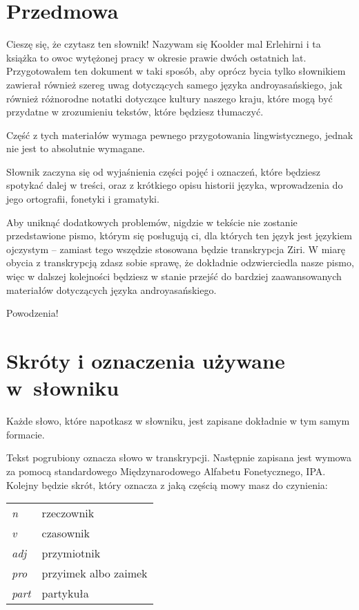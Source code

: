 \newpage

\section{Przedmowa}

Cieszę się, że czytasz ten słownik! Nazywam się Koolder mal Erlehirni i ta książka to owoc wytężonej pracy w okresie prawie dwóch ostatnich lat. Przygotowałem ten dokument w taki sposób, aby oprócz bycia tylko słownikiem zawierał również szereg uwag dotyczących samego języka androyasańskiego, jak również różnorodne notatki dotyczące kultury naszego kraju, które mogą być przydatne w zrozumieniu tekstów, które będziesz tłumaczyć.

Część z tych materiałów wymaga pewnego przygotowania lingwistycznego, jednak nie jest to absolutnie wymagane.

Słownik zaczyna się od wyjaśnienia części pojęć i oznaczeń, które będziesz spotykać dalej w treści, oraz z krótkiego opisu historii języka, wprowadzenia do jego ortografii, fonetyki i gramatyki.

Aby uniknąć dodatkowych problemów, nigdzie w tekście nie zostanie przedstawione pismo, którym się posługują ci, dla których ten język jest językiem ojczystym – zamiast tego wszędzie stosowana będzie transkrypcja Ziri. W miarę obycia z transkrypcją zdasz sobie sprawę, że dokładnie odzwierciedla nasze pismo, więc w dalszej kolejności będziesz w stanie przejść do bardziej zaawansowanych materiałów dotyczących języka androyasańskiego.

Powodzenia!

\section[Skróty i oznaczenia]{Skróty i oznaczenia używane w~słowniku}

Każde słowo, które napotkasz w słowniku, jest zapisane dokładnie w tym samym formacie.

Tekst pogrubiony oznacza słowo w transkrypcji. Następnie zapisana jest wymowa za pomocą standardowego Międzynarodowego Alfabetu Fonetycznego, IPA. Kolejny będzie skrót, który oznacza z jaką częścią mowy masz do czynienia:

\begin{table}[h]
\begin{tabular}{ll}
\emph{n}    & rzeczownik           \\
\emph{v}    & czasownik            \\
\emph{adj}  & przymiotnik          \\
\emph{pro}  & przyimek albo zaimek \\
\emph{part} & partykuła           
\end{tabular}
\end{table}

